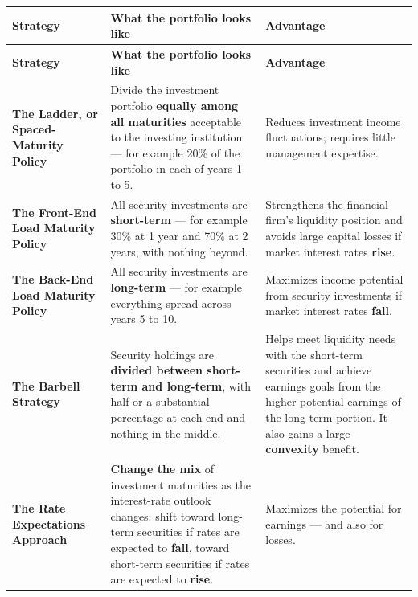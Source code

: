\begin{center}
\scriptsize
\begin{longtable}{@{}p{2.9cm} p{5.0cm} p{5.6cm}@{}}
\toprule
\rowcolor{FRMSoft}\textbf{Strategy} & \textbf{What the portfolio looks like} & \textbf{Advantage} \\
\midrule
\endfirsthead
\toprule
\rowcolor{FRMSoft}\textbf{Strategy} & \textbf{What the portfolio looks like} & \textbf{Advantage} \\
\midrule
\endhead
\textbf{The Ladder, or Spaced-Maturity Policy} \newline {\color{FRMGrey}$\star\star\star$} &
Divide the investment portfolio \textbf{equally among all maturities} acceptable to the investing institution — for example 20\% of the portfolio in each of years 1 to 5. &
Reduces investment income fluctuations; requires little management expertise. \\
\addlinespace
\textbf{The Front-End Load Maturity Policy} \newline {\color{FRMGrey}$\star\star\star$} &
All security investments are \textbf{short-term} — for example 30\% at 1 year and 70\% at 2 years, with nothing beyond. &
Strengthens the financial firm's liquidity position and avoids large capital losses if market interest rates \textbf{rise}. \\
\addlinespace
\textbf{The Back-End Load Maturity Policy} \newline {\color{FRMGrey}$\star\star\star$} &
All security investments are \textbf{long-term} — for example everything spread across years 5 to 10. &
Maximizes income potential from security investments if market interest rates \textbf{fall}. \\
\addlinespace
\textbf{The Barbell Strategy} \newline {\color{FRMGrey}$\star\star\star$} &
Security holdings are \textbf{divided between short-term and long-term}, with half or a substantial percentage at each end and nothing in the middle. &
Helps meet liquidity needs with the short-term securities and achieve earnings goals from the higher potential earnings of the long-term portion. It also gains a large \textbf{convexity} benefit. \\
\addlinespace
\textbf{The Rate Expectations Approach} \newline {\color{FRMGrey}$\star\star\star$} &
\textbf{Change the mix} of investment maturities as the interest-rate outlook changes: shift toward long-term securities if rates are expected to \textbf{fall}, toward short-term securities if rates are expected to \textbf{rise}. &
Maximizes the potential for earnings --- and also for losses. \\
\bottomrule
\end{longtable}
\end{center}

